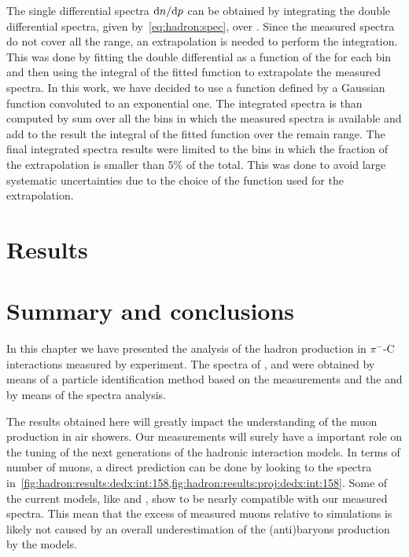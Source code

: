 The single differential spectra $\text{d}n/\text{d}p$ can be obtained
by integrating the double differential spectra,
given by~\cref{eq:hadron:spec}, over \pT. Since the measured
spectra do not cover all the \pT range, an extrapolation is needed
to perform the integration. This was done by fitting
the double differential as a function of the \pT for each \pp bin
and then using the integral of the fitted function to
extrapolate the measured spectra.  
In this work, we have decided to use a function
defined by a Gaussian function convoluted to
an exponential one. 
The \pT integrated spectra is than computed by sum over
all the \pT bins in which the measured spectra is available
and add to the result the integral of the fitted function
over the remain \pT range. The final \pT integrated spectra results
were limited to the \pp bins in which the fraction of the extrapolation
is smaller than 5\% of the total. This was done to avoid large systematic
uncertainties due to the choice of the function used for the extrapolation.


\section{Results}
\label{sec:hadron:results}



\section{Summary and conclusions}


In this chapter we have presented the
analysis of the hadron production in $\pi^-$-C interactions
measured by \NASixtyOne experiment. 
The spectra of \pions, \kaons and \protons were obtained by
means of a particle identification method based on the
\dedx measurements and the \lambs and \kzeros by means
of the \minv spectra analysis.





The results obtained here will greatly impact the understanding
of the muon production in air showers.
Our measurements will surely have a important role
on the tuning of the next generations of the hadronic
interaction models. In terms of number of muons,
a direct prediction can be done by looking
to the \antiproton spectra
in~\cref{fig:hadron:results:dedx:int:158,fig:hadron:results:proj:dedx:int:158}.
Some of the current models, like \EposLong and \SibyllNewLong, 
show to be nearly compatible with our measured spectra.
This mean that the excess of measured muons 
relative to simulations is likely not caused
by an overall underestimation of the (anti)baryons
production by the models.  



